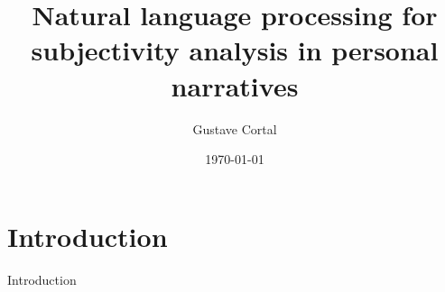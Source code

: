 \documentclass[handout,10pt]{beamer}
\title{Natural language processing for\\ subjectivity analysis in personal narratives}
\author{Gustave Cortal}
\institute{\footnotesize gustavecortal@gmail.com}
\date{\today}
\begin{document}
\setlength{\parskip}{5pt}%
\setlength{\parsep}{0pt}%
\setlength{\itemsep}{0.25cm}%
\setlength{\leftmargini}{0.5cm}

\begin{frame}
  \titlepage
\end{frame}

\section{Introduction}
\begin{frame}{}
\Large
\vfill
\begin{center}
    Introduction
\end{center}
\vfill
\end{frame}

% 
\end{document}
